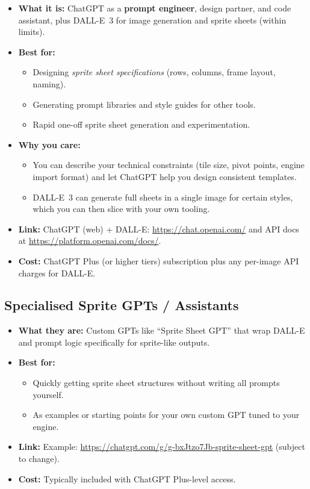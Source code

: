 \documentclass[11pt]{article}
\begin{document}
\begin{itemize}
    \item \textbf{What it is:} ChatGPT as a \textbf{prompt engineer}, design partner, and code assistant, plus DALL-E~3 for image generation and sprite sheets (within limits).
    \item \textbf{Best for:}
    \begin{itemize}
        \item Designing \emph{sprite sheet specifications} (rows, columns, frame layout, naming).
        \item Generating prompt libraries and style guides for other tools.
        \item Rapid one-off sprite sheet generation and experimentation.
    \end{itemize}
    \item \textbf{Why you care:}
    \begin{itemize}
        \item You can describe your technical constraints (tile size, pivot points, engine import format) and let ChatGPT help you design consistent templates.
        \item DALL-E~3 can generate full sheets in a single image for certain styles, which you can then slice with your own tooling.
    \end{itemize}
    \item \textbf{Link:} ChatGPT (web) + DALL-E: \url{https://chat.openai.com/} and API docs at \url{https://platform.openai.com/docs/}.
    \item \textbf{Cost:} ChatGPT Plus (or higher tiers) subscription plus any per-image API charges for DALL-E.
\end{itemize}

\subsection{Specialised Sprite GPTs / Assistants}

\begin{itemize}
    \item \textbf{What they are:} Custom GPTs like ``Sprite Sheet GPT'' that wrap DALL-E and prompt logic specifically for sprite-like outputs.
    \item \textbf{Best for:}
    \begin{itemize}
        \item Quickly getting sprite sheet structures without writing all prompts yourself.
        \item As examples or starting points for your own custom GPT tuned to your engine.
    \end{itemize}
    \item \textbf{Link:} Example: \url{https://chatgpt.com/g/g-bxJtzo7Jb-sprite-sheet-gpt} (subject to change).
    \item \textbf{Cost:} Typically included with ChatGPT Plus-level access.
\end{itemize}
\end{document}
